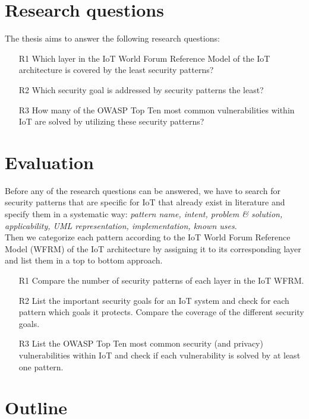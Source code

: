 \documentclass[
    numbers=noenddot,
    parskip=half-,
    fontsize=12pt,
    paper=a4,
    oneside,
    titlepage,
    bibliography=totoc,
    chapterprefix=false,
]{scrbook}
\begin{document}
    \chapter{Research questions}\label{ch:research-questions}
    The thesis aims to answer the following research questions:
    
	\begin{enumerate}
	\item[R1] Which layer in the IoT World Forum Reference Model of the IoT architecture is covered by the least security patterns?
	\item[R2] Which security goal is addressed by security patterns the least?
	\item[R3] How many of the OWASP Top Ten most common vulnerabilities within IoT are solved by utilizing these security patterns?
	\end{enumerate}


    \chapter{Evaluation}\label{ch:evaluation}
    
     Before any of the research questions can be answered, we have to search for security patterns that are specific for IoT that already exist in literature and specify them in a systematic way: \emph{pattern name, intent, problem \& solution, applicability, UML representation, implementation, known uses}. \\
     Then we categorize each pattern according to the IoT World Forum Reference Model (WFRM) of the IoT architecture by assigning it to its corresponding layer and list them in a top to bottom approach.
    
    \begin{enumerate}
    	\item[R1] Compare the number of security patterns of each layer in the IoT WFRM.
    	\item[R2] List the important security goals for an IoT system and check for each pattern which goals it protects. Compare the coverage of the different security goals.
    	\item[R3] List the OWASP Top Ten most common security (and
    	privacy) vulnerabilities within IoT and check if each
    	vulnerability is solved by at least one pattern.
    \end{enumerate}

	
	\chapter{Outline}\label{ch:outline}
	
\end{document}

